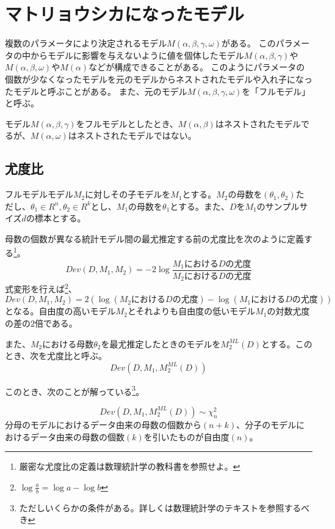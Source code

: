 \section{マトリョウシカになったモデル}
複数のパラメータにより決定されるモデル$M(\alpha,\beta,\gamma,\omega)$がある。
このパラメータの中からモデルに影響を与えないように値を個体したモデル$M(\alpha,\beta,\gamma)$や$M(\alpha,\beta,\omega)$や$M(\alpha)$などが構成できることがある。
このようにパラメータの個数が少なくなったモデルを元のモデルからネストされたモデルや入れ子になったモデルと呼ぶことがある。
また、元のモデル$M(\alpha,\beta,\gamma,\omega)$を「フルモデル」と呼ぶ。

モデル$M(\alpha,\beta,\gamma)$をフルモデルとしたとき、$M(
\alpha,\beta)$はネストされたモデルでるが、$M(\alpha,\omega)$はネストされたモデルではない。

\subsection{尤度比}
フルモデルモデル$M_2$に対しその子モデルを$M_1$とする。$M_2$の母数を$(\theta_1,\theta_2)$ただし、$\theta_1\in R^n,\theta_2\in R^k$とし、$M_1$の母数を$\theta_1$とする。また、$D$を$M_1$のサンプルサイズ$d$の標本とする。

\begin{defi}
 母数の個数が異なる統計モデル間の最尤推定する前の尤度比を次のように定義する\footnote{厳密な尤度比の定義は数理統計学の教科書を参照せよ。}。
 \begin{equation*}\label{likelihood_equation}
  Dev(D,M_1,M_2) = -2\log\frac{M_1におけるDの尤度}{M_2におけるDの尤度}
 \end{equation*}
式変形を行えば\footnote{$\log\frac{a}{b} =\log a -\log b$}、
 \begin{equation*}\label{loglikelihood_equation_log_minus_log}
 Dev(D,M_1,M_2) = 2\left( \log ( M_2におけるDの尤度 )-\log ( M_1におけるDの尤度 ) \right)
 \end{equation*}
となる。自由度の高いモデル$M_2$とそれよりも自由度の低いモデル$M_1$の対数尤度の差の$2$倍である。

 また、$M_2$における母数$\theta_2$を最尤推定したときのモデルを$M^{ML}_2(D)$とする。このとき、次を尤度比と呼ぶ。
 \begin{equation*}
  Dev(D,M_1,M_2^{ML}(D))
 \end{equation*}
\end{defi}

このとき、次のことが解っている\footnote{ただしいくらかの条件がある。詳しくは数理統計学のテキストを参照するべき}。
\begin{theo}    \label{likelihood_test_basic}
\begin{equation*}
 Dev(D,M_1,M_2^{ML}(D)) \sim \chi^2_{n}
\end{equation*}
分母のモデルにおけるデータ由来の母数の個数から$(n+k)$、分子のモデルにおけるデータ由来の母数の個数$(k)$を引いたものが自由度$(n)$。
\end{theo}

